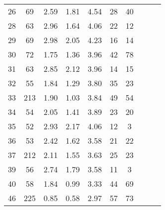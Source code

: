 \begin{tabular}{lccccccccc}
26 &       69 &                             2.59 &                             1.81 &                             4.54 &              28 &              40 \\
28 &       63 &                             2.96 &                             1.64 &                             4.06 &              22 &              12 \\
29 &       69 &                             2.98 &                             2.05 &                             4.23 &              16 &              14 \\
30 &       72 &                             1.75 &                             1.36 &                             3.96 &              42 &              78 \\
31 &       63 &                             2.85 &                             2.12 &                             3.96 &              14 &              15 \\
32 &       55 &                             1.84 &                             1.29 &                             3.80 &              35 &              23 \\
33 &      213 &                             1.90 &                             1.03 &                             3.84 &              49 &              54 \\
34 &       54 &                             2.05 &                             1.41 &                             3.89 &              23 &              20 \\
35 &       52 &                             2.93 &                             2.17 &                             4.06 &              12 &               3 \\
36 &       53 &                             2.42 &                             1.62 &                             3.58 &              21 &              22 \\
37 &      212 &                             2.11 &                             1.55 &                             3.63 &              25 &              23 \\
39 &       56 &                             2.74 &                             1.79 &                             3.58 &              11 &               3 \\
40 &       58 &                             1.84 &                             0.99 &                             3.33 &              44 &              69 \\
46 &      225 &                             0.85 &                             0.58 &                             2.97 &              57 &              73 \\

\end{tabular}
